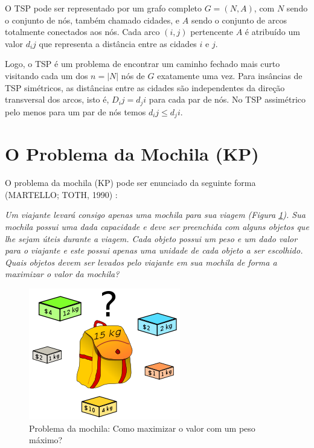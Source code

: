 O TSP pode ser representado por um grafo completo $G = (N, A)$, com $N$ sendo o conjunto de nós, também chamado cidades, e $A$ sendo o conjunto de arcos totalmente conectados aos nós. Cada arco $(i, j)$ pertencente $A$ é atribuído um valor $d_ij$ que representa a distância entre as cidades $i$ e $j$.

Logo, o TSP é um problema de encontrar um caminho fechado mais curto visitando cada um dos $n = |N|$ nós de $G$ exatamente uma vez. Para insâncias de TSP simétricos, as distâncias entre as cidades são independentes da direção transversal dos arcos, isto é, $D_ij = d_ji$ para cada par de nós. No TSP assimétrico pelo menos para um par de nós temos $d_ij \leq d_ji$.

\section{O Problema da Mochila (KP)}
\label{sec-kp}

O problema da mochila (KP) pode ser enunciado da seguinte forma (MARTELLO; TOTH, 1990) \cite{Martello:1990:KPA:98124}:

\textit{Um viajante levará consigo apenas uma mochila para sua viagem (Figura \ref{fig:kp-sample}). Sua mochila possui uma dada capacidade e deve ser preenchida com alguns objetos que lhe sejam úteis durante a viagem. Cada objeto possui um peso e um dado valor para o viajante e este possui apenas uma unidade de cada objeto a ser escolhido. Quais objetos devem ser levados pelo viajante em sua mochila de forma a maximizar o valor da mochila?}

\begin{figure}[h]
	\caption{\label{fig:kp-sample}Problema da mochila: Como maximizar o valor com um peso máximo?}
	\begin{center}
	    \includegraphics[scale=0.5]{imagens/kp-sample.png}
	\end{center}
\end{figure}


